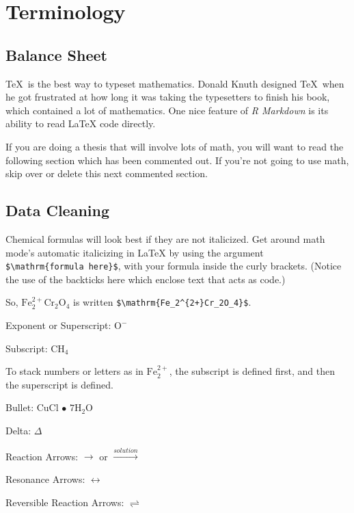 \documentclass[]{book}
\begin{document}
\chapter{Terminology}\label{terminology}

\section{Balance Sheet}\label{balance-sheet}

\TeX~is the best way to typeset mathematics. Donald Knuth designed
\TeX~when he got frustrated at how long it was taking the typesetters to
finish his book, which contained a lot of mathematics. One nice feature
of \emph{R Markdown} is its ability to read LaTeX code directly.

If you are doing a thesis that will involve lots of math, you will want
to read the following section which has been commented out. If you're
not going to use math, skip over or delete this next commented section.

\section{Data Cleaning}\label{data-cleaning}

Chemical formulas will look best if they are not italicized. Get around
math mode's automatic italicizing in LaTeX by using the argument
\texttt{\$\textbackslash{}mathrm\{formula\ here\}\$}, with your formula
inside the curly brackets. (Notice the use of the backticks here which
enclose text that acts as code.)

So, \(\mathrm{Fe_2^{2+}Cr_2O_4}\) is written
\texttt{\$\textbackslash{}mathrm\{Fe\_2\^{}\{2+\}Cr\_2O\_4\}\$}.

\noindent Exponent or Superscript: \(\mathrm{O^-}\)

\noindent Subscript: \(\mathrm{CH_4}\)

To stack numbers or letters as in \(\mathrm{Fe_2^{2+}}\), the subscript
is defined first, and then the superscript is defined.

\noindent Bullet: CuCl \(\bullet\) \(\mathrm{7H_{2}O}\)

\noindent Delta: \(\Delta\)

\noindent Reaction Arrows: \(\longrightarrow\) or
\(\xrightarrow{solution}\)

\noindent Resonance Arrows: \(\leftrightarrow\)

\noindent Reversible Reaction Arrows: \(\rightleftharpoons\)
\end{document}
